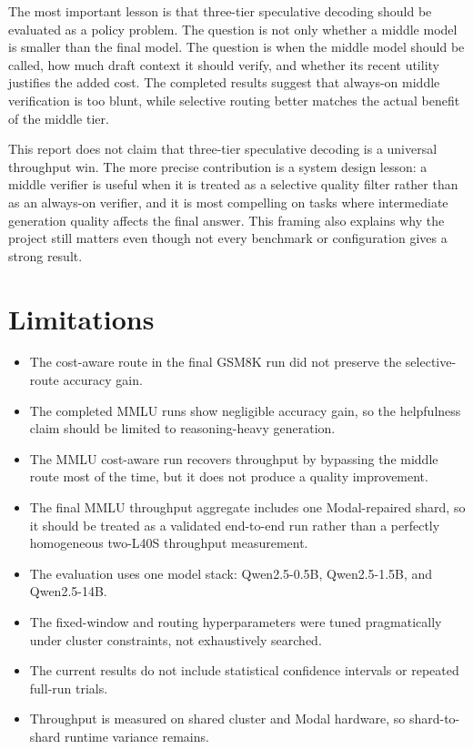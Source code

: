 \documentclass[11pt]{article}
\begin{document}
The most important lesson is that three-tier speculative decoding should be evaluated as a policy problem. The question is not only whether a middle model is smaller than the final model. The question is when the middle model should be called, how much draft context it should verify, and whether its recent utility justifies the added cost. The completed results suggest that always-on middle verification is too blunt, while selective routing better matches the actual benefit of the middle tier.

This report does not claim that three-tier speculative decoding is a universal throughput win. The more precise contribution is a system design lesson: a middle verifier is useful when it is treated as a selective quality filter rather than as an always-on verifier, and it is most compelling on tasks where intermediate generation quality affects the final answer. This framing also explains why the project still matters even though not every benchmark or configuration gives a strong result.

\section{Limitations}

\begin{itemize}
  \item The cost-aware route in the final GSM8K run did not preserve the selective-route accuracy gain.
  \item The completed MMLU runs show negligible accuracy gain, so the helpfulness claim should be limited to reasoning-heavy generation.
  \item The MMLU cost-aware run recovers throughput by bypassing the middle route most of the time, but it does not produce a quality improvement.
  \item The final MMLU throughput aggregate includes one Modal-repaired shard, so it should be treated as a validated end-to-end run rather than a perfectly homogeneous two-L40S throughput measurement.
  \item The evaluation uses one model stack: Qwen2.5-0.5B, Qwen2.5-1.5B, and Qwen2.5-14B.
  \item The fixed-window and routing hyperparameters were tuned pragmatically under cluster constraints, not exhaustively searched.
  \item The current results do not include statistical confidence intervals or repeated full-run trials.
  \item Throughput is measured on shared cluster and Modal hardware, so shard-to-shard runtime variance remains.
\end{itemize}
\end{document}
